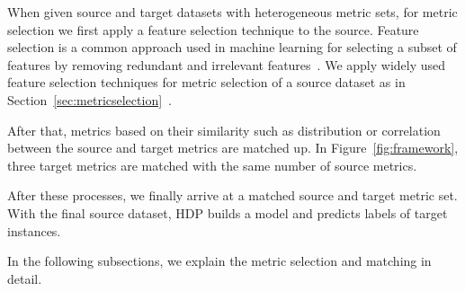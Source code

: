When given source and target datasets with heterogeneous metric sets, for metric
selection we first apply a feature selection technique to the source. Feature
selection is a common approach used in machine learning for selecting a subset
of features by removing redundant and irrelevant features~\cite{Guyon03}.
We apply widely used feature selection
techniques for metric selection of a source dataset as in
Section~\ref{sec:metricselection}~\cite{Gao11,Shivaji13}.

After that, metrics based on their similarity such as distribution
or correlation between the source and target metrics are matched up. In
Figure~\ref{fig:framework}, three target metrics are matched with the
same number of source metrics.

After these processes, we finally
arrive at a matched source and target metric set. With the final
source dataset, HDP builds a model and predicts labels of
target instances.

In the following subsections, we explain the metric selection and matching in
detail.
  


